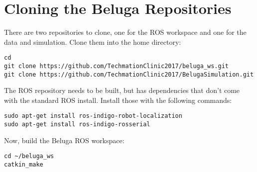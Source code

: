 \documentclass{article}
\begin{document}
\section*{Cloning the Beluga Repositories}
There are two repositories to clone, one for the ROS workspace and one for the data and simulation.
Clone them into the home directory:

\begin{verbatim}
cd
git clone https://github.com/TechmationClinic2017/beluga_ws.git
git clone https://github.com/TechmationClinic2017/BelugaSimulation.git
\end{verbatim}

The ROS repository needs to be built, but has dependencies that don't come with the standard ROS install.
Install those with the following commands:

\begin{verbatim}
sudo apt-get install ros-indigo-robot-localization
sudo apt-get install ros-indigo-rosserial
\end{verbatim}

Now, build the Beluga ROS workspace:

\begin{verbatim}
cd ~/beluga_ws
catkin_make
\end{verbatim}
\end{document}
